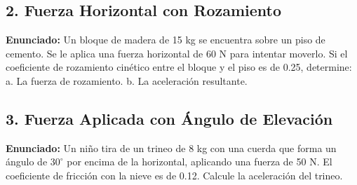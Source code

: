 \documentclass[12pt, letterpaper]{article}
\begin{document}
	
	\subsection*{2. Fuerza Horizontal con Rozamiento}
	\noindent \textbf{Enunciado:} Un bloque de madera de 15 kg se encuentra sobre un piso de cemento. Se le aplica una fuerza horizontal de 60 N para intentar moverlo. Si el coeficiente de rozamiento cinético entre el bloque y el piso es de 0.25, determine: a. La fuerza de rozamiento. b. La aceleración resultante.
	
	
	\subsection*{3. Fuerza Aplicada con Ángulo de Elevación}
	\noindent \textbf{Enunciado:} Un niño tira de un trineo de 8 kg con una cuerda que forma un ángulo de $30^{\circ}$ por encima de la horizontal, aplicando una fuerza de 50 N. El coeficiente de fricción con la nieve es de 0.12. Calcule la aceleración del trineo.
	
\end{document}
